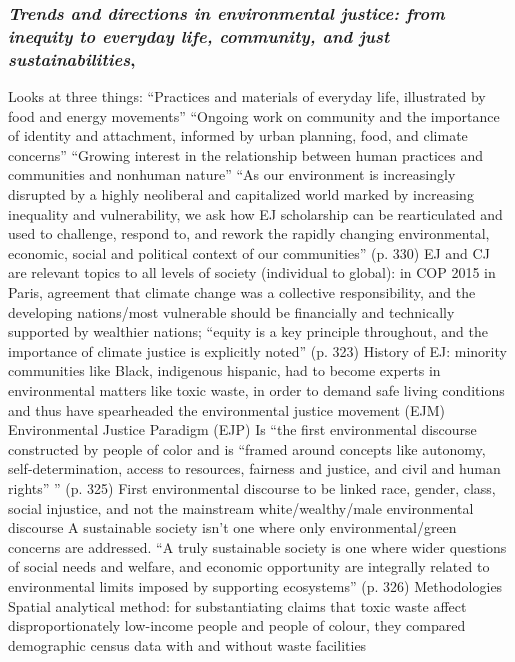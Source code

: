 \documentclass{article}
\begin{document}
\subsubsection{\textit{Trends and directions in environmental justice: from inequity to everyday life, community, and just sustainabilities}, \parencite{agyeman2016trends}}

\begin{outline}
	\1 Looks at three things:
		\2 ``Practices and materials of everyday life, illustrated by food and energy movements''
		\2 ``Ongoing work on community and the importance of identity and attachment, informed by urban planning, food, and climate concerns''
		\2 ``Growing interest in the relationship between human practices and communities and nonhuman nature''
		\2 ``As our environment is increasingly disrupted by a highly neoliberal and capitalized world marked by increasing inequality and vulnerability, we ask how EJ scholarship can be rearticulated and used to challenge, respond to, and rework the rapidly changing environmental, economic, social and political context of our communities''  (p. 330)
	\1 EJ and CJ are relevant topics to all levels of society (individual to global): in COP 2015 in Paris, agreement that climate change was a collective responsibility, and the developing nations/most vulnerable should be financially and technically supported by wealthier nations; ``equity is a key principle throughout, and the importance of climate justice is explicitly noted'' (p. 323)
	\1 History of EJ: minority communities like Black, indigenous hispanic, had to become experts in environmental matters like toxic waste, in order to demand safe living conditions and thus have spearheaded the environmental justice movement (EJM)
	\1 Environmental Justice Paradigm (EJP)
		\2 Is ``the first environmental discourse constructed by people of color and is ``framed around concepts like autonomy, self-determination, access to resources, fairness and justice, and civil and human rights'' '' (p. 325)
		\2 First environmental discourse to be linked race, gender, class, social injustice, and not the mainstream white/wealthy/male environmental discourse
		\2 A sustainable society isn't one where only environmental/green concerns are addressed. ``A truly sustainable society is one where wider questions of social needs and welfare, and economic opportunity are integrally related to environmental limits imposed by supporting ecosystems'' (p. 326)
	\1 Methodologies
		\2 Spatial analytical method: for substantiating claims that toxic waste affect disproportionately low-income people and people of colour, they compared demographic census data with and without waste facilities

\end{outline}
\end{document}
